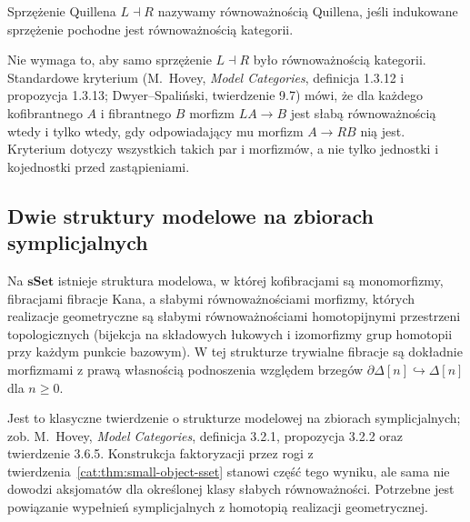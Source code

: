 \begin{definicja}\label{cat:def:quillen-equivalence}
Sprzężenie Quillena $L\dashv R$ nazywamy równoważnością Quillena, jeśli indukowane sprzężenie pochodne jest równoważnością kategorii.
\end{definicja}
Nie wymaga to, aby samo sprzężenie $L\dashv R$ było równoważnością kategorii. Standardowe kryterium (M.~Hovey, \emph{Model Categories}, definicja 1.3.12 i propozycja 1.3.13; Dwyer--Spaliński, twierdzenie 9.7) mówi, że dla każdego kofibrantnego $A$ i fibrantnego $B$ morfizm $LA\to B$ jest słabą równoważnością wtedy i tylko wtedy, gdy odpowiadający mu morfizm $A\to RB$ nią jest. Kryterium dotyczy wszystkich takich par i morfizmów, a nie tylko jednostki i kojednostki przed zastąpieniami.

\subsection{Dwie struktury modelowe na zbiorach symplicjalnych}

\begin{twierdzenie}\label{cat:thm:kan-quillen-model}
Na $\mathbf{sSet}$ istnieje struktura modelowa, w której kofibracjami są monomorfizmy, fibracjami fibracje Kana, a słabymi równoważnościami morfizmy, których realizacje geometryczne są słabymi równoważnościami homotopijnymi przestrzeni topologicznych (bijekcja na składowych łukowych i izomorfizmy grup homotopii przy każdym punkcie bazowym). W tej strukturze trywialne fibracje są dokładnie morfizmami z prawą własnością podnoszenia względem brzegów $\partial\Delta[n]\hookrightarrow\Delta[n]$ dla $n\geq0$.
\end{twierdzenie}
Jest to klasyczne twierdzenie o strukturze modelowej na zbiorach symplicjalnych; zob. M.~Hovey, \emph{Model Categories}, definicja 3.2.1, propozycja 3.2.2 oraz twierdzenie 3.6.5. Konstrukcja faktoryzacji przez rogi z twierdzenia~\ref{cat:thm:small-object-sset} stanowi część tego wyniku, ale sama nie dowodzi aksjomatów dla określonej klasy słabych równoważności. Potrzebne jest powiązanie wypełnień symplicjalnych z homotopią realizacji geometrycznej.

